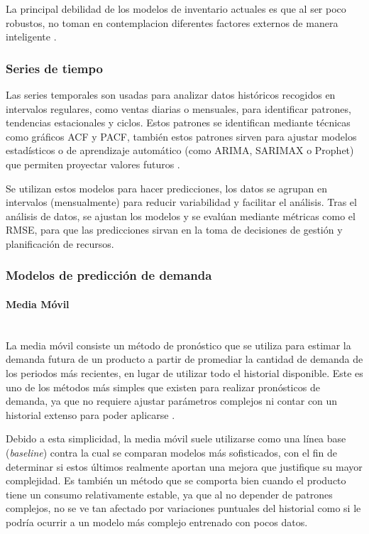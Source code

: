 La principal debilidad de los modelos de inventario actuales es que al ser poco robustos, no toman en contemplacion diferentes factores externos de manera inteligente \cite{valencia2015}.

\subsubsection{Series de tiempo}

Las series temporales son usadas para analizar datos históricos recogidos en intervalos regulares, como ventas diarias o mensuales, para identificar patrones, tendencias estacionales y ciclos. Estos patrones se identifican mediante técnicas como gráficos ACF y PACF, también estos patrones sirven para ajustar modelos estadísticos o de aprendizaje automático (como ARIMA, SARIMAX o Prophet) que permiten proyectar valores futuros \cite{10596_69801}.

Se utilizan estos modelos para hacer predicciones, los datos se agrupan en intervalos (mensualmente) para reducir variabilidad y facilitar el análisis. Tras el análisis de datos, se ajustan los modelos y se evalúan mediante métricas como el RMSE, para que las predicciones sirvan en la toma de decisiones de gestión y planificación de recursos.


\subsubsection{Modelos de predicción de demanda}
\paragraph{Media Móvil}\mbox{}\\
La media móvil consiste un método de pronóstico que se utiliza para estimar la demanda futura de un producto a partir de promediar la cantidad de demanda de los periodos más recientes, en lugar de utilizar todo el historial disponible. Este es uno de los métodos más simples que existen para realizar pronósticos de demanda, ya que no requiere ajustar parámetros complejos ni contar con un historial extenso para poder aplicarse \cite{verma2019movingaverage}.

Debido a esta simplicidad, la media móvil suele utilizarse como una línea base (\textit{baseline}) contra la cual se comparan modelos más sofisticados, con el fin de determinar si estos últimos realmente aportan una mejora que justifique su mayor complejidad. Es también un método que se comporta bien cuando el producto tiene un consumo relativamente estable, ya que al no depender de patrones complejos, no se ve tan afectado por variaciones puntuales del historial como si le podría ocurrir a un modelo más complejo entrenado con pocos datos.

